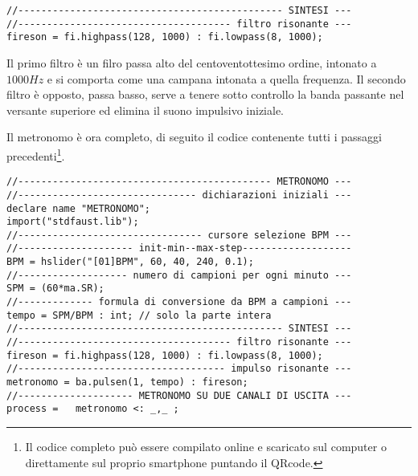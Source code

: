 \begin{lstlisting}
//---------------------------------------------- SINTESI ---
//------------------------------------- filtro risonante ---
fireson = fi.highpass(128, 1000) : fi.lowpass(8, 1000);
\end{lstlisting}

Il primo filtro è un filro passa alto del centoventottesimo ordine, intonato a
$1000Hz$ e si comporta come una campana intonata a quella frequenza. Il secondo
filtro è opposto, passa basso, serve a tenere sotto controllo la banda passante nel
versante superiore ed elimina il suono impulsivo iniziale.

Il metronomo è ora completo, di seguito il codice contenente tutti i passaggi
precedenti\footnote{Il codice completo può essere compilato online e scaricato
sul computer o direttamente sul proprio smartphone puntando il QRcode.}.

\begin{lstlisting}
//-------------------------------------------- METRONOMO ---
//------------------------------- dichiarazioni iniziali ---
declare name "METRONOMO";
import("stdfaust.lib");
//-------------------------------- cursore selezione BPM ---
//-------------------- init-min--max-step-------------------
BPM = hslider("[01]BPM", 60, 40, 240, 0.1);
//------------------- numero di campioni per ogni minuto ---
SPM = (60*ma.SR);
//------------- formula di conversione da BPM a campioni ---
tempo = SPM/BPM : int; // solo la parte intera
//---------------------------------------------- SINTESI ---
//------------------------------------- filtro risonante ---
fireson = fi.highpass(128, 1000) : fi.lowpass(8, 1000);
//------------------------------------ impulso risonante ---
metronomo = ba.pulsen(1, tempo) : fireson;
//-------------------- METRONOMO SU DUE CANALI DI USCITA ---
process =   metronomo <: _,_ ;
\end{lstlisting}
